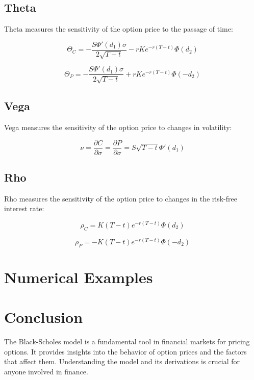 \documentclass[../main.tex]{subfiles}
\begin{document}
\subsection{Theta}

Theta measures the sensitivity of the option price to the passage of time:

\begin{equation}
    \Theta_C = -\frac{S \Phi'(d_1) \sigma}{2 \sqrt{T - t}} - r K e^{-r(T - t)} \Phi(d_2)
\end{equation}

\begin{equation}
    \Theta_P = -\frac{S \Phi'(d_1) \sigma}{2 \sqrt{T - t}} + r K e^{-r(T - t)} \Phi(-d_2)
\end{equation}

\subsection{Vega}

Vega measures the sensitivity of the option price to changes in volatility:

\begin{equation}
    \nu = \frac{\partial C}{\partial \sigma} = \frac{\partial P}{\partial \sigma} = S \sqrt{T - t} \Phi'(d_1)
\end{equation}

\subsection{Rho}

Rho measures the sensitivity of the option price to changes in the risk-free interest rate:

\begin{equation}
    \rho_C = K (T - t) e^{-r(T - t)} \Phi(d_2)
\end{equation}

\begin{equation}
    \rho_P = -K (T - t) e^{-r(T - t)} \Phi(-d_2)
\end{equation}


\section{Numerical Examples}



\section{Conclusion}

The Black-Scholes model is a fundamental tool in financial markets for pricing options. It provides insights into the behavior of option prices and the factors that affect them. Understanding the model and its derivations is crucial for anyone involved in finance.
\end{document}
